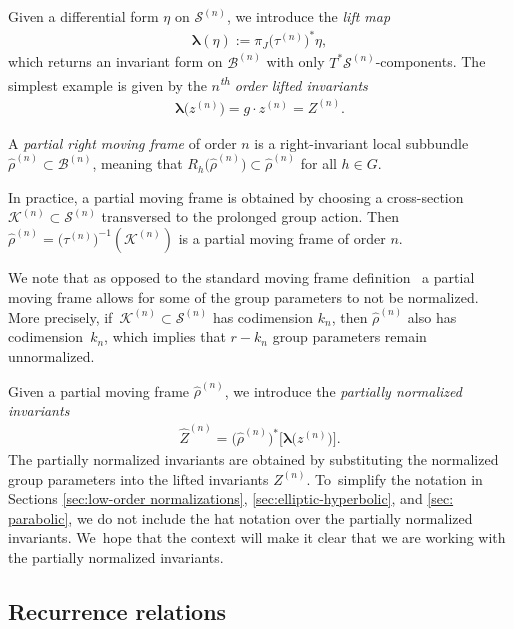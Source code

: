 \documentclass[pdftex]{sigma}%
\numberwithin{equation}{section}
\newcommand{\B}{\mathcal{B}}
\newcommand{\K}{\mathcal{K}}
\newcommand{\bl}{\boldsymbol{\lambda}}
\newcommand{\n}{^{(n)}}
\newcommand{\mS}{\mathcal{S}}
\begin{document}
Given a differential form $\eta$ on $\mathcal{S}\n$, we introduce the \emph{lift map}
\begin{gather}\label{eq:lift}
\bl(\eta):=\pi_J\big(\tau\n\big)^*\eta,
\end{gather}
which returns an invariant form on $\B\n$ with only $T^*\mS\n$-components. The simplest example is given by the \emph{$n$\textsuperscript{th} order lifted invariants}
\begin{gather*}
\bl\big(z\n\big)=g\cdot z\n=Z\n.
\end{gather*}
\begin{Definition}
A \emph{partial right moving frame} of order $n$ is a right-invariant local subbundle $\widehat{\rho}\n \subset \B\n$, meaning that $R_h\big(\widehat{\rho}\n\big) \subset \widehat{\rho}\n$ for all $h\in G$.
\end{Definition}

In practice, a partial moving frame is obtained by choosing a cross-section $\K\n\subset \mS\n$ transversed to the prolonged group action. Then $\widehat{\rho}\n =\big(\tau\n\big)^{-1}(\mathcal{K}\n)$ is a partial moving frame of order $n$.

\begin{Remark}
We note that as opposed to the standard moving frame definition~\cite{FO-1999} a partial moving frame allows for some of the group parameters to not be normalized. More precisely, if~$\K\n\subset \mS\n$ has codimension $k_n$, then $\widehat{\rho}\n$ also has codimension~$k_n$, which implies that $r-k_n$ group parameters remain unnormalized.
\end{Remark}

Given a partial moving frame $\widehat{\rho}\n$, we introduce the \emph{partially normalized invariants}
\begin{gather*}
\widehat{Z}\n =\big(\widehat{\rho}\n\big)^*\big[\bl\big(z\n\big)\big].
\end{gather*}
The partially normalized invariants are obtained by substituting the normalized group parameters into the lifted invariants $Z\n$. To~simplify the notation in Sections \ref{sec:low-order normalizations}, \ref{sec:elliptic-hyperbolic}, and \ref{sec: parabolic}, we do not include the hat notation over the partially normalized invariants. We~hope that the context will make it clear that we are working with the partially normalized invariants.

\subsection{Recurrence relations}
\end{document}
